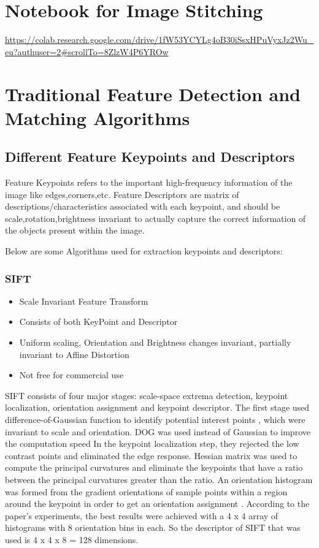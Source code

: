 \documentclass{article}[11pt]
\begin{document}
\section{Notebook for Image Stitching}

\url{https://colab.research.google.com/drive/1fW53YCYLg4oB30iSsxHPuVyxJz2Wu_eu?authuser=2#scrollTo=8ZlzW4P6YROw}

\section{Traditional Feature Detection and Matching Algorithms}

\subsection{Different Feature Keypoints and Descriptors}

Feature Keypoints refers to the important high-frequency information of the image like edges,corners,etc.
Feature Descriptors are matrix of descriptions/characteristics associated with each keypoint, and should be scale,rotation,brightness invariant to actually capture the correct information of the objects present within the image.

Below are some Algorithms used for extraction keypoints and descriptors:

\subsubsection{SIFT}
\begin{itemize}
    \item Scale Invariant Feature Transform
    \item Consists of both KeyPoint and Descriptor

    \item  Uniform scaling, Orientation and Brightness changes invariant, partially invariant to Affine Distortion
    \item Not free for commercial use
\end{itemize}

SIFT consists of four major stages: scale-space extrema detection, keypoint localization, orientation
assignment and keypoint descriptor. The first stage used difference-of-Gaussian function to identify
potential interest points , which were invariant to scale and orientation. DOG was used instead of
Gaussian to improve the computation speed 
In the keypoint localization step, they rejected the low contrast points and eliminated the edge response.
Hessian matrix was used to compute the principal curvatures and eliminate the keypoints that have a
ratio between the principal curvatures greater than the ratio. An orientation histogram was formed from
the gradient orientations of sample points within a region around the keypoint in order to get an
orientation assignment . According to the paper’s experiments, the best results were achieved with a
4 x 4 array of histograms with 8 orientation bins in each. So the descriptor of SIFT that was used is 4 x 4
x 8 = 128 dimensions.
\end{document}
